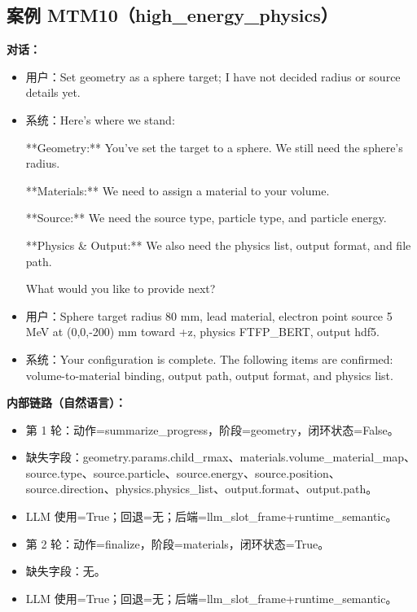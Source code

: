 \documentclass[11pt]{ctexart}
\begin{document}
\subsection{案例 MTM10（high\_energy\_physics）}
\textbf{对话：}
\begin{itemize}
\item 用户：Set geometry as a sphere target; I have not decided radius or source details yet.
\item 系统：Here's where we stand:

**Geometry:** You've set the target to a sphere. We still need the sphere's radius.

**Materials:** We need to assign a material to your volume.

**Source:** We need the source type, particle type, and particle energy.

**Physics \& Output:** We also need the physics list, output format, and file path.

What would you like to provide next?
\item 用户：Sphere target radius 80 mm, lead material, electron point source 5 MeV at (0,0,-200) mm toward +z, physics FTFP\_BERT, output hdf5.
\item 系统：Your configuration is complete. The following items are confirmed: volume-to-material binding, output path, output format, and physics list.
\end{itemize}
\textbf{内部链路（自然语言）：}
\begin{itemize}
\item 第 1 轮：动作=summarize\_progress，阶段=geometry，闭环状态=False。
\item 缺失字段：geometry.params.child\_rmax、materials.volume\_material\_map、source.type、source.particle、source.energy、source.position、source.direction、physics.physics\_list、output.format、output.path。
\item LLM 使用=True；回退=无；后端=llm\_slot\_frame+runtime\_semantic。
\item 第 2 轮：动作=finalize，阶段=materials，闭环状态=True。
\item 缺失字段：无。
\item LLM 使用=True；回退=无；后端=llm\_slot\_frame+runtime\_semantic。
\end{itemize}
\end{document}
